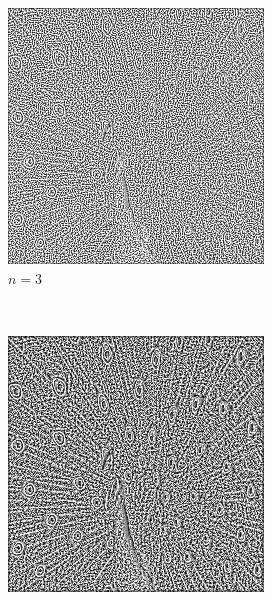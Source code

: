 \documentclass{article}
\begin{document}
\begin{enumerate}[label=(\alph*)]
    \begin{figure}[!htb]
        \centering
        \begin{subfigure}[b]{0.3\textwidth}
            \includegraphics[width=\textwidth]{img/L3.png}
            \caption{$n = 3$}
        \end{subfigure}
        ~
        \begin{subfigure}[b]{0.3\textwidth}
            \includegraphics[width=\textwidth]{img/L5.png}

\end{subfigure}
\end{figure}
\end{enumerate}
\end{document}

